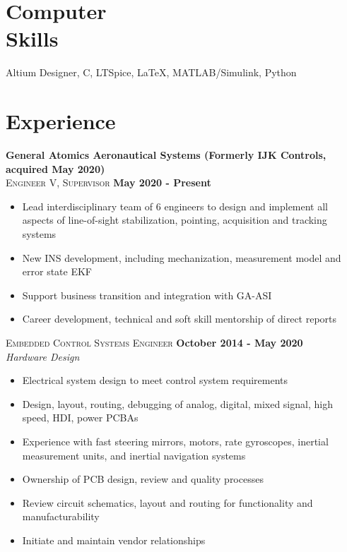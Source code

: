 \documentclass[margin,line]{resume}
\begin{document}
\begin{resume}
    \section{\mysidestyle Computer\\ Skills}

    Altium Designer, C, LTSpice, \LaTeX , MATLAB/Simulink, Python


    \section{\mysidestyle Experience}
    
    \textbf{General Atomics Aeronautical Systems (Formerly IJK Controls, acquired May 2020)}\\
    \textsc{Engineer V, Supervisor} \hfill \textbf{May 2020 - Present}\\ \vspace{-4mm}
    \begin{itemize} \itemsep -2pt
    		\item Lead interdisciplinary team of 6 engineers to design and implement all aspects of line-of-sight stabilization, pointing, acquisition and tracking systems
		\item New INS development, including mechanization, measurement model and error state EKF
    		\item Support business transition and integration with GA-ASI
		\item Career development, technical and soft skill mentorship of direct reports
    	\end{itemize} \vspace{-2.25mm}
    	
    \textsc{Embedded Control Systems Engineer} \hfill \textbf{October 2014 - May 2020}\\ \vspace{-4mm}
    \textsl{Hardware Design}\\
    \begin{itemize} \itemsep -2pt
    		\item Electrical system design to meet control system requirements
        \item Design, layout, routing, debugging of analog, digital, mixed signal, high speed, HDI, power PCBAs
        \item Experience with fast steering mirrors, motors, rate gyroscopes, inertial measurement units, and inertial navigation systems
        \item Ownership of PCB design, review and quality processes
        \item Review circuit schematics, layout and routing for functionality and manufacturability
        \item Initiate and maintain vendor relationships
     \end{itemize}\vspace{-4mm}
     

\end{resume}
\end{document}
